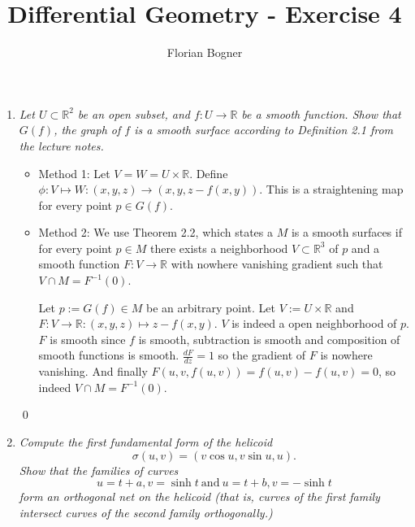 \documentclass[a4paper,11pt,notitlepage,fullpage]{article}
\begin{document}
\author{Florian Bogner}
\title{Differential Geometry - Exercise 4}
\maketitle

\begin{enumerate}
\item \emph{Let $U \subset \mathbb R^2$ be an open subset, and $f: U\to\mathbb R$ be a smooth function. Show that $G\left(f\right)$, the graph of $f$ is a smooth surface according to Definition 2.1 from the lecture notes.}
\begin{itemize}

\item Method 1:
Let $V = W = U \times \mathbb R$. Define $\phi:V \mapsto W:\left(x,y,z\right)\to\left(x,y,z-f\left(x,y\right)\right)$. This is a straightening map for every point $p \in G\left(f\right)$.

\item Method 2:
We use Theorem 2.2, which states a $M$ is a smooth surfaces if for every point $p \in M$ there exists a neighborhood $V \subset \mathbb R^3$ of $p$ and a smooth function $F: V\to\mathbb R$ with nowhere vanishing gradient such that $V\cap M = F^{-1}\left(0\right)$.

Let $p := G\left(f\right) \in M$ be an arbitrary point. Let $V := U\times\mathbb R$ and $F: V\to\mathbb R : \left(x,y,z\right) \mapsto z-f\left(x,y\right)$. $V$ is indeed a open neighborhood of $p$. $F$ is smooth since $f$ is smooth, subtraction is smooth and composition of smooth functions is smooth. $\frac{dF}{dz} = 1$ so the gradient of $F$ is nowhere vanishing. And finally $F\left(u,v,f\left(u,v\right)\right) = f\left(u,v\right)-f\left(u,v\right) = 0$, so indeed $V\cap M = F^{-1}\left(0\right)$.
\end{itemize}
\qed


\item \emph{Compute the first fundamental form of the helicoid}
\begin{equation*}
\sigma\left(u,v\right) = \left(v\cos u,v\sin u, u\right). 
\end{equation*}
\emph{Show that the families of curves}
\begin{equation*}
u = t+a, v = \sinh t ~\text{and}~ u = t+b, v = -\sinh t
\end{equation*}
\emph{form an orthogonal net on the helicoid (that is, curves of the first family intersect curves of the second family orthogonally.)}


\end{enumerate}
\end{document}
